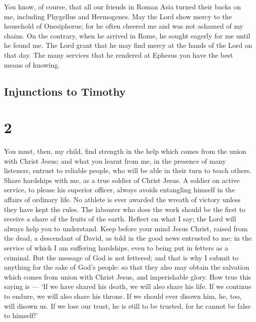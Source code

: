  You know, of course, that all our friends in Roman Asia
turned their backs on me, including Phygellus and Hermogenes.
 May the Lord show mercy to the household of Onesiphorus;
for he often cheered me and was not ashamed of my chains. 
On the contrary, when he arrived in Rome, he sought eagerly for me until
he found me.  The Lord grant that he may find mercy at the
hands of the Lord on that day. The many services that he rendered at
Ephesus you have the best means of knowing.

\hypertarget{injunctions-to-timothy}{%
\subsection{Injunctions to Timothy}\label{injunctions-to-timothy}}

\hypertarget{section-1}{%
\section{2}\label{section-1}}

 You must, then, my child, find strength in the help which
comes from the union with Christ Jesus;  and what you learnt
from me, in the presence of many listeners, entrust to reliable people,
who will be able in their turn to teach others.  Share
hardships with me, as a true soldier of Christ Jesus.  A
soldier on active service, to please his superior officer, always avoids
entangling himself in the affairs of ordinary life.  No
athlete is ever awarded the wreath of victory unless they have kept the
rules.  The labourer who does the work should be the first
to receive a share of the fruits of the earth.  Reflect on
what I say; the Lord will always help you to understand. 
Keep before your mind Jesus Christ, raised from the dead, a descendant
of David, as told in the good news entrusted to me;  in the
service of which I am suffering hardships, even to being put in fetters
as a criminal. But the message of God is not fettered;  and
that is why I submit to anything for the sake of God's people: so that
they also may obtain the salvation which comes from union with Christ
Jesus, and imperishable glory.  How true this saying is ---
`If we have shared his death, we will also share his life. 
If we continue to endure, we will also share his throne. If we should
ever disown him, he, too, will disown us.  If we lose our
trust, he is still to be trusted, for he cannot be false to himself!'

